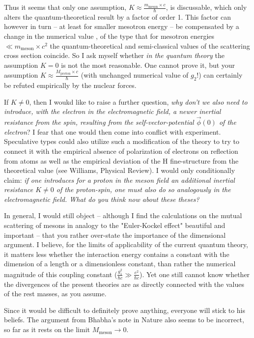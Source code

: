 \documentclass{article}
\begin{document}
Thus it seems that only one assumption, $K \approx \frac{m_\text{meson}\times c}{\hbar}$, is discussable, which only alters the quantum-theoretical result by a factor of order 1. This factor can however in turn -- at least for smaller mesotron energy -- be compensated by a change in the numerical value , of the type that for mesotron energies $\ll m_\text{meson}\times c^2$ the quantum-theoretical and semi-classical values of the scattering cross section coincide. So I ask myself whether \textit{in the quantum theory} the assumption $K=0$ is not the most reasonable. One cannot prove it, but your assumption $K \approx \frac{M_\text{proton}\times c}{\hbar}$ (with unchanged numerical value of $g_2$!) can certainly be refuted empirically by the nuclear forces.

If $K \neq 0$, then I woukd like to raise a further question, \textit{why don't we also need to introduce, with the electron in the electromagnetic field, a newer inertial resistance from the spin, resulting from the self-vector-potential $\vec{\phi}(0)$ of the electron}? I fear that one would then come into conflict with experiment. Speculative types could also utilize such a modification of the theory to try to connect it with the empirical absence of polarization of electrons on reflection from atoms as well as the empirical deviation of the H fine-structure from the theoretical value (see Williams, Physical Review). I would only conditionally claim: \textit{if one introduces for a proton in the meson field an additional inertial resistance $K\neq 0$ of the proton-spin, one must also do so analogously in the electromagnetic field. What do you think now about these theses?}

In general, I would still object -- although I find the calculations on the mutual scattering of mesons in analogy to the "Euler-Kockel effect" beautiful and important -- that you rather over-state the importance of the dimensional argument. I believe, for the limits of applicability of the current quantum theory, it matters less whether the interaction energy contains a constant with the dimension of a length or a dimensionless constant, than rather the numerical magnitude of this coupling constant ($\frac{g_1^2}{\hbar c} \gg \frac{e^2}{\hbar c}$). Yet one still cannot know whether the divergences of the present theories are as directly connected with the values of the rest masses, as you assume.

Since it would be difficult to definitely prove anything, everyone will stick to his beliefs. The argument from Bhabha's note in Nature also seems to be incorrect, so far as it rests on the limit $M_\text{meson} \to 0$.
\end{document}
